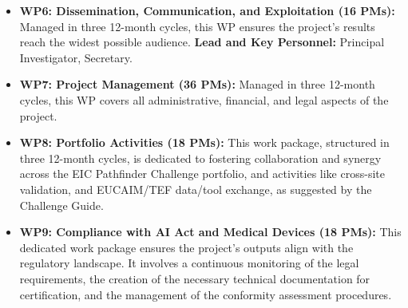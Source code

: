 \documentclass[11pt, a4paper]{article}
\begin{document}
\begin{itemize}
    \item \textbf{WP6: Dissemination, Communication, and Exploitation (16 PMs):} Managed in three 12-month cycles, this WP ensures the project's results reach the widest possible audience. \textbf{Lead and Key Personnel:} Principal Investigator, Secretary.
    \item \textbf{WP7: Project Management (36 PMs):} Managed in three 12-month cycles, this WP covers all administrative, financial, and legal aspects of the project. 
      \item \textbf{WP8: Portfolio Activities (18 PMs):} This work package, structured in three 12-month cycles, is dedicated to fostering collaboration and synergy across the EIC Pathfinder Challenge portfolio, and activities like cross-site validation, and EUCAIM/TEF data/tool exchange, as suggested by the Challenge Guide.
    \item \textbf{WP9: Compliance with AI Act and Medical Devices (18 PMs):} This dedicated work package ensures the project's outputs align with the regulatory landscape. It involves a continuous monitoring of the legal requirements, the creation of the necessary technical documentation for certification, and the management of the conformity assessment procedures. 

\end{itemize}
\end{document}
